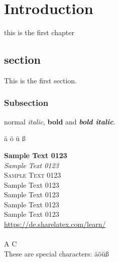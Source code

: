 \chapter{Introduction}

this is the first chapter

\section{section}

This is the first section.

\subsection{Subsection}

normal \emph{italic}, \textbf{bold} and \textbf{\emph{bold italic}}.

ä ö ü ß


{\textbf{Sample Text 0123}}
\\ %
{\textit{Sample Text 0123}}
\\ %
{\textsc{Sample Text 0123}}
\\ %
{\textsf{Sample Text 0123}}
\\ %
{\tiny{Sample Text 0123}}
\\ %
{\normalsize{Sample Text 0123}}
\\ %
{\huge{Sample Text 0123}}
\\ %
{\color{HyperlinkBlue}\url{https://de.sharelatex.com/learn/}}
\\
\\
A  C
\\
These are special characters: äöüß